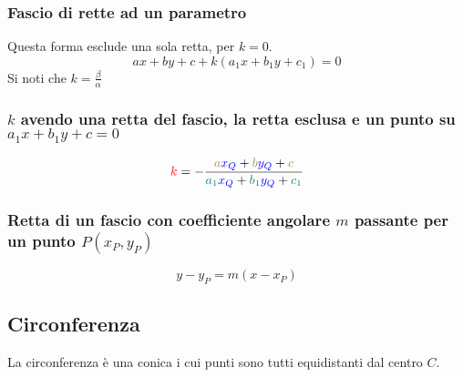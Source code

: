 \subsubsection{Fascio di rette ad un parametro}
Questa forma esclude una sola retta, per $k = 0$.
\begin{equation*}
ax + by + c + k(a_1x + b_1y + c_1) = 0
\end{equation*}
Si noti che $k = \frac{\beta}{\alpha}$

\subsubsection{$k$ avendo una retta del fascio, la retta esclusa e un punto su $a_1x + b_1y + c = 0$}
\begin{center}
\end{center}
\begin{equation*}
\mathcolor{red}{k} = -\frac{
	\mathcolor{brown}{a}\mathcolor{blue}{x_Q} + \mathcolor{brown}{b}\mathcolor{blue}{y_Q} +
	\mathcolor{brown}{c}
}{
	\mathcolor{teal}{a_1}\mathcolor{blue}{x_Q} + \mathcolor{teal}{b_1}\mathcolor{blue}{y_Q} +
	\mathcolor{teal}{c_1}
}
\end{equation*}

\subsubsection{Retta di un fascio con coefficiente angolare $m$ passante per un punto $P(x_P,y_P)$}
\begin{equation*}
y-y_P = m(x-x_P)
\end{equation*}

\subsection{Circonferenza}\label{subsec:geomana:circ}
La circonferenza è una conica i cui punti sono tutti equidistanti dal centro $C$.
\begin{center}
\end{center}

